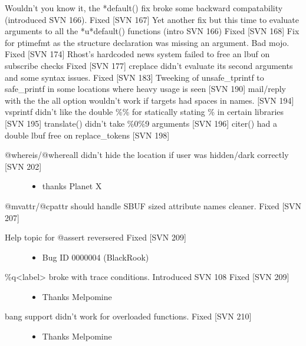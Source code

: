 \documentclass[letterpaper,10pt,english]{sphinxmanual}
\begin{document}
\sphinxAtStartPar
Wouldn’t you know it, the *default() fix broke some backward compatability (introduced SVN 166).  Fixed {[}SVN 167{]}
Yet another fix but this time to evaluate arguments to all the *u*default() functions (intro SVN 166) Fixed {[}SVN 168{]}
Fix for ptimefmt as the structure declaration was missing an argument.  Bad mojo. \sphinxhyphen{} Fixed {[}SVN 174{]}
Rhost’s hardcoded news system failed to free an lbuf on subscribe checks \sphinxhyphen{} Fixed {[}SVN 177{]}
creplace didn’t evaluate its second arguments and some syntax issues. \sphinxhyphen{} Fixed {[}SVN 183{]}
Tweeking of unsafe\_tprintf to safe\_printf in some locations where heavy usage is seen {[}SVN 190{]}
mail/reply with the the all option wouldn’t work if targets had spaces in names. {[}SVN 194{]}
vsprintf didn’t like the double \%\% for statically stating \% in certain libraries {[}SVN 195{]}
translate() didn’t take \%0\sphinxhyphen{}\%9 arguments {[}SVN 196{]}
citer() had a double lbuf free on replace\_tokens {[}SVN 198{]}
\begin{description}
\item[{@whereis/@whereall didn’t hide the location if user was hidden/dark correctly {[}SVN 202{]}}] \leavevmode\begin{itemize}
\item {} 
\sphinxAtStartPar
thanks Planet X

\end{itemize}

\end{description}

\sphinxAtStartPar
@mvattr/@cpattr should handle SBUF sized attribute names cleaner. \sphinxhyphen{} Fixed {[}SVN 207{]}
\begin{description}
\item[{Help topic for @assert reversered \sphinxhyphen{} Fixed {[}SVN 209{]}}] \leavevmode\begin{itemize}
\item {} 
\sphinxAtStartPar
Bug ID 0000004 (BlackRook)

\end{itemize}

\item[{\%q\textless{}label\textgreater{} broke with trace conditions.  Introduced SVN 108 \sphinxhyphen{} Fixed {[}SVN 209{]}}] \leavevmode\begin{itemize}
\item {} 
\sphinxAtStartPar
Thanks Melpomine

\end{itemize}

\item[{bang support didn’t work for overloaded functions.  Fixed {[}SVN 210{]}}] \leavevmode\begin{itemize}
\item {} 
\sphinxAtStartPar
Thanks Melpomine

\end{itemize}

\end{description}
\end{document}
